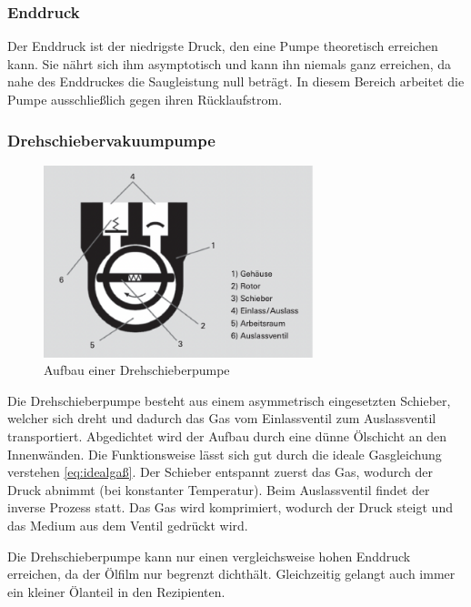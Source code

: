 \subsubsection{Enddruck}
Der Enddruck ist der niedrigste Druck, den eine Pumpe theoretisch erreichen kann.
Sie nährt sich ihm asymptotisch und kann ihn niemals ganz erreichen,
da nahe des Enddruckes die Saugleistung null beträgt.
In diesem Bereich arbeitet die Pumpe ausschließlich gegen ihren Rücklaufstrom.

\subsubsection{Drehschiebervakuumpumpe}
\begin{figure}[h]
    \centering
    \includegraphics[width=0.7\textwidth]{abb/drehpumpe.png}
    \caption{Aufbau einer Drehschieberpumpe \cite{Pfeifer}} 
    \label{fig:drehpumpe}
\end{figure} 
Die Drehschieberpumpe besteht aus einem asymmetrisch eingesetzten Schieber, 
welcher sich dreht und dadurch das Gas vom Einlassventil zum Auslassventil transportiert.
Abgedichtet wird der Aufbau durch eine dünne Ölschicht an den Innenwänden.
Die Funktionsweise lässt sich gut durch die ideale Gasgleichung verstehen \eqref{eq:idealgaß}.
Der Schieber entspannt zuerst das Gas, 
wodurch der Druck abnimmt (bei konstanter Temperatur).
Beim Auslassventil findet der inverse Prozess statt.
Das Gas wird komprimiert, wodurch der Druck steigt 
und das Medium aus dem Ventil gedrückt wird.

Die Drehschieberpumpe kann nur einen vergleichsweise hohen Enddruck erreichen,
da der Ölfilm nur begrenzt dichthält.
Gleichzeitig gelangt auch immer ein kleiner Ölanteil in den Rezipienten.

